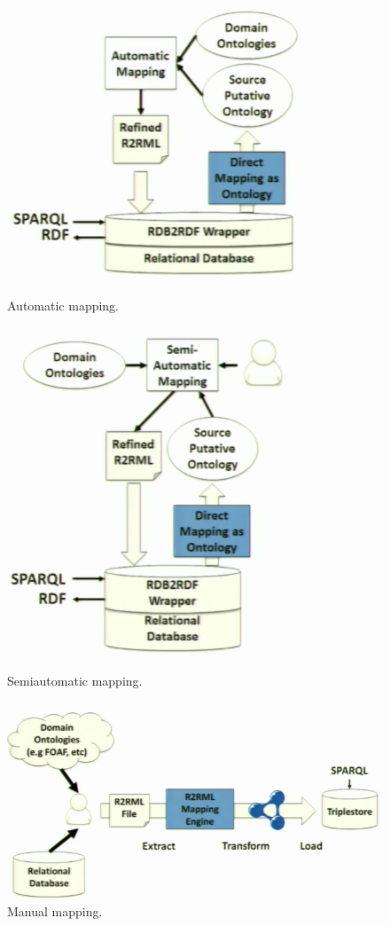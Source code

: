 \documentclass[11pt]{llncs}
\begin{document}
\begin{figure}[!htb]
 \includegraphics[scale = 0.35]{img/automaticMapping.png}
  \caption{Automatic mapping. \cite{rdb2rdf_vimeo_euclid}}
  \label{fig:mapping_auto}
\endminipage\hfill
{}
 \includegraphics[scale = 0.35]{img/semiautomaticMapping.png}
  \caption{Semiautomatic mapping. \cite{rdb2rdf_vimeo_euclid}}
  \label{fig:mapping_semi}
\endminipage\hfill
{}%
 \includegraphics[scale = 0.3]{img/manualMapping.png}
 \caption{Manual mapping. \cite{rdb2rdf_vimeo_euclid}}
 \label{fig:mapping_manual}
\endminipage
\end{figure}
\end{document}

